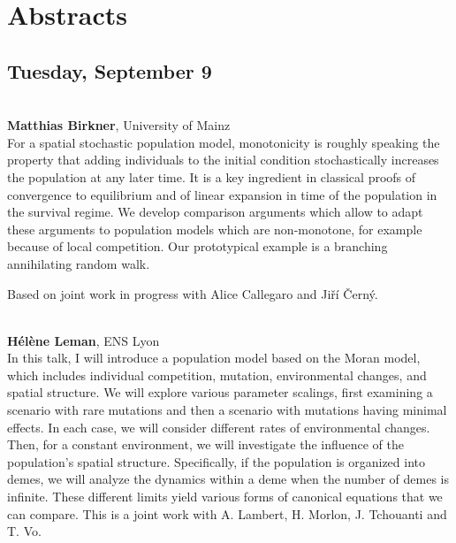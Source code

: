 \documentclass[12pt,a4paper]{article}
\begin{document}
\newpage

\section*{\sffamily Abstracts}
\subsection*{\sffamily Tuesday, September 9}
\bigskip\bigskip
{}\\[1ex]{ \large \textbf{ Matthias Birkner}}, University of Mainz \\[2ex] For a spatial stochastic population model, monotonicity is roughly speaking the property that adding individuals to the initial condition stochastically increases the population at any later time. It is a key ingredient in classical proofs of convergence to equilibrium and of linear expansion in time of the population in the survival regime. We develop comparison arguments which allow to adapt these arguments to population models which are non-monotone, for example because of local competition. Our prototypical example is a branching annihilating random walk. 

 Based on joint work in progress with Alice Callegaro and Ji\v{r}\'{i} \v{C}ern\'y. 

\bigskip\bigskip

\\[1ex]{ \large \textbf{ Hélène Leman}}, ENS Lyon \\[2ex] In this talk, I will introduce a population model based on the Moran model, which includes individual competition, mutation, environmental changes, and spatial structure. We will explore various parameter scalings, first examining a scenario with rare mutations and then a scenario with mutations having minimal effects. In each case, we will consider different rates of environmental changes. Then, for a constant environment, we will investigate the influence of the population's spatial structure. Specifically, if the population is organized into demes, we will analyze the dynamics within a deme when the number of demes is infinite. These different limits yield various forms of canonical equations that we can compare. This is a joint work with A. Lambert, H. Morlon, J. Tchouanti and T. Vo. 

\bigskip\bigskip
\end{document}

